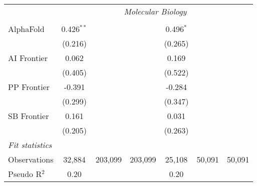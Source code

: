\begin{tabular}{lcccccc}
 & \multicolumn{6}{c}{\textit{Molecular Biology}} \\ \\
   AlphaFold    & 0.426$^{**}$ &         &         & 0.496$^{*}$ &        &   \\   
                & (0.216)      &         &         & (0.265)     &        &   \\   
   AI Frontier  & 0.062        &         &         & 0.169       &        &   \\   
                & (0.405)      &         &         & (0.522)     &        &   \\   
   PP Frontier  & -0.391       &         &         & -0.284      &        &   \\   
                & (0.299)      &         &         & (0.347)     &        &   \\   
   SB Frontier  & 0.161        &         &         & 0.031       &        &   \\   
                & (0.205)      &         &         & (0.263)     &        &   \\   
   \midrule
   \emph{Fit statistics}\\
   Observations & 32,884       & 203,099 & 203,099 & 25,108      & 50,091 & 50,091\\  
   Pseudo R$^2$ & 0.20         &         &         & 0.20        &        & \\  
   

\end{tabular}
